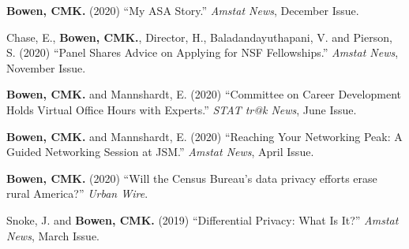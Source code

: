 \begin{etaremune}[topsep=0pt, itemsep=5pt, partopsep=0pt, parsep=0pt]
    \item \textbf{Bowen, CMK.} (2020) ``My ASA Story.'' \textit{Amstat News}, December Issue.

    \item Chase, E., \textbf{Bowen, CMK.}, Director, H., Baladandayuthapani, V. and Pierson, S. (2020) ``Panel Shares Advice on Applying for NSF Fellowships.'' \textit{Amstat News}, November Issue.

    \item \textbf{Bowen, CMK.} and Mannshardt, E. (2020) ``Committee on Career Development Holds Virtual Office Hours with Experts.'' \textit{STAT tr@k News}, June Issue.

    \item \textbf{Bowen, CMK.} and Mannshardt, E. (2020) ``Reaching Your Networking Peak: A Guided Networking Session at JSM.'' \textit{Amstat News}, April Issue.
    
    \item \textbf{Bowen, CMK.} (2020) ``Will the Census Bureau's data privacy efforts erase rural America?'' \textit{Urban Wire}. 
    
    \item Snoke, J. and \textbf{Bowen, CMK.} (2019) ``Differential Privacy: What Is It?'' \textit{Amstat News}, March Issue.
\end{etaremune}